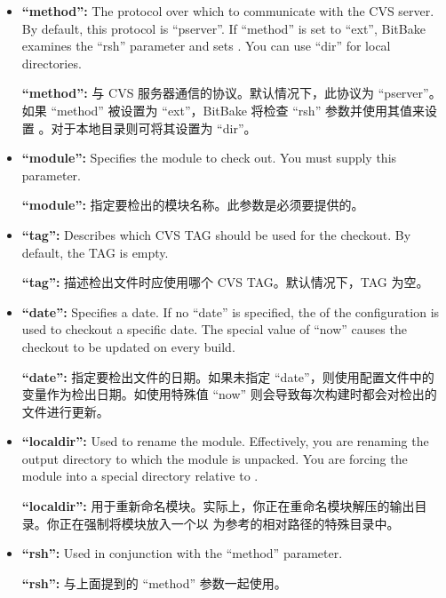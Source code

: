 \begin{itemize}
\setlength\itemsep{1.0em}
\item \textbf{``method'':} The protocol over which to communicate with the CVS server. By default, this protocol is ``pserver''. If ``method'' is set to ``ext'', BitBake examines the ``rsh'' parameter and sets . You can use ``dir'' for local directories.

\medskip
\textbf{``method'':} 与 CVS 服务器通信的协议。默认情况下，此协议为 ``pserver''。如果 ``method'' 被设置为 ``ext''，BitBake 将检查 ``rsh'' 参数并使用其值来设置 。对于本地目录则可将其设置为 ``dir''。

\item \textbf{``module'':} Specifies the module to check out. You must supply this parameter.

\medskip
\textbf{``module'':} 指定要检出的模块名称。此参数是必须要提供的。

\item \textbf{``tag'':} Describes which CVS TAG should be used for the checkout. By default, the TAG is empty.

\medskip
\textbf{``tag'':} 描述检出文件时应使用哪个 CVS TAG。默认情况下，TAG 为空。

\item \textbf{``date'':} Specifies a date. If no ``date'' is specified, the  of the configuration is used to checkout a specific date. The special value of ``now'' causes the checkout to be updated on every build.

\medskip
\textbf{``date'':} 指定要检出文件的日期。如果未​​指定 ``date''，则使用配置文件中的  变量作为检出日期。如使用特殊值 ``now'' 则会导致每次构建时都会对检出的文件进行更新。

\item \textbf{``localdir'':} Used to rename the module. Effectively, you are renaming the output directory to which the module is unpacked. You are forcing the module into a special directory relative to .

\medskip
\textbf{``localdir'':} 用于重新命名模块。实际上，你正在重命名模块解压的输出目录。你正在强制将模块放入一个以  为参考的相对路径的特殊目录中。

\item \textbf{``rsh'':} Used in conjunction with the ``method'' parameter.

\medskip
\textbf{``rsh'':} 与上面提到的 ``method'' 参数一起使用。


\end{itemize}
